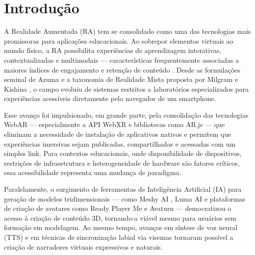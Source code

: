 \documentclass[
  12pt,
  openright,
  twoside,
  a4paper,
  english,
  brazil
]{abntex2}
\begin{document}
\tableofcontents*
\cleardoublepage

\textual

\chapter{Introdução}
\label{cap:introducao}

A Realidade Aumentada (RA) tem se consolidado como uma das tecnologias mais
promissoras para aplicações educacionais. Ao sobrepor elementos virtuais ao
mundo físico, a RA possibilita experiências de aprendizagem interativas,
contextualizadas e multimodais — características frequentemente associadas a
maiores índices de engajamento e retenção de conteúdo
\cite{fonnet2021review, munoz2021education}. Desde as formulações seminal de
Azuma \cite{azuma1997} e a taxonomia de Realidade Mista proposta por Milgram
e Kishino \cite{milgram1994}, o campo evoluiu de sistemas restritos a
laboratórios especializados para experiências acessíveis diretamente pelo
navegador de um smartphone.

Esse avanço foi impulsionado, em grande parte, pela consolidação das
tecnologias WebAR — especialmente a API WebXR \cite{webxr2020} e bibliotecas
como AR.js \cite{arjs} — que eliminam a necessidade de instalação de
aplicativos nativos e permitem que experiências imersivas sejam publicadas,
compartilhadas e acessadas com um simples link. Para contextos educacionais,
onde disponibilidade de dispositivos, restrições de infraestrutura e
heterogeneidade de hardware são fatores críticos, essa acessibilidade
representa uma mudança de paradigma.

Paralelamente, o surgimento de ferramentas de Inteligência Artificial (IA)
para geração de modelos tridimensionais — como Meshy AI \cite{meshy2024},
Luma AI \cite{lumaai2024} e plataformas de criação de avatares como
Ready Player Me \cite{readyplayerme} e Avaturn — democratizou o acesso à
criação de conteúdo 3D, tornando-a viável mesmo para usuários sem formação
em modelagem. Ao mesmo tempo, avanços em síntese de voz neural (TTS) e em
técnicas de sincronização labial via visemas tornaram possível a criação de
narradores virtuais expressivos e naturais.
\end{document}
